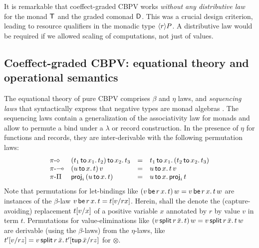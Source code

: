 \documentclass[acmsmall,review,anonymous]{acmart}\settopmatter{printfolios=true,printccs=false,printacmref=false}
\begin{document}
It is remarkable that coeffect-graded CBPV works \emph{without any
  distributive law} \cite{orchard:icfp16}
for the monad $\T$ and the graded comonad $\D$.
%
This was a crucial design criterion, leading to resource qualifiers in
the monadic type $\compty r P$.
%
A distributive law would be required if we allowed scaling of
computations, not just of values.


\subsection{Coeffect-graded CBPV: equational theory and operational semantics}

The equational theory of pure CBPV comprises $\beta$ and $\eta$ laws,
and \emph{sequencing laws} that syntactically express that negative
types are monad algebras \citep[Fig.~11]{levy:hosc06}.  The sequencing
laws contain a generalization of the associativity law for monads and
allow to permute a bind under a $\lambda$ or record construction.  In
the presence of $\eta$ for functions and records, they are
inter-derivable with the following permutation laws:
\[
\begin{array}{llcl}
\rpi\diamond
  & \bind {x_2} {(\bind {x_1} {t_1} {t_2})} {t_3}
  & = & \bind {x_1} {t_1} {(\bind {x_2} {t_2} {t_3})}
\\
\rpi\lolli
  & \app {(\bind x u t)} v
  & = & \bind x u {\app t v}
\\
\rpi\Pi
  & \proj i {(\bind x  u t)}
  & = & \bind x u {\proj i t}
\end{array}
\]
Note that permutations for let-bindings like
$\app{(\qlet r x v t)}w = \qlet r x v {\app t w}$ are instances of the
$\beta$-law $\qlet r x v t = \qsubst v r x t$.
%
Herein,  shall the denote the
(capture-avoiding) replacement $\subst v x t$ of a positive variable
$x$ annotated by $r$ by value $v$ in term $t$.
%
Permutations for value-eliminations like
$\app {(\qsplits r v {\bar x} t)} w = \qsplits r v {\bar x} {\app t
  w}$
are derivable (using the $\beta$-laws) from the $\eta$-laws, like
$\qsubst{v}{r}{z}{t'} = \qsplits r {v} {\bar x} {\qsubst {\ptup {\bar
      x}} r z {t'}}$ for $\otimes$.

\end{document}
